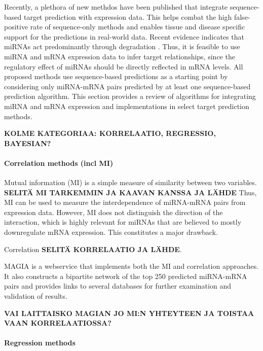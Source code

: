 Recently, a plethora of new methdos have been published that integrate
sequence-based target prediction with expression data. This helps combat the
high false-positive rate of sequence-only methods and enables tissue and
disease specific support for the predictions in real-world data. Recent
evidence indicates that miRNAs act predominantly through degradation
\citep{CITE}. Thus, it is feasible to use miRNA and mRNA expression data to
infer target relationships, since the regulatory effect of miRNAs should be
directly reflected in mRNA levels. All proposed methods use sequence-based
predictions as a starting point by considering only miRNA-mRNA pairs predicted
by at least one sequence-based prediction algorithm. This section provides a
review of algorithms for integrating miRNA and mRNA expression and
implementations in select target prediction methods.

\textbf{KOLME KATEGORIAA: KORRELAATIO, REGRESSIO, BAYESIAN?}



\paragraph{Correlation methods (incl MI)}\label{correlation-methods}

Mutual information (MI) is a simple measure of similarity between two
variables. \textbf{SELITÄ MI TARKEMMIN JA KAAVAN KANSSA JA LÄHDE} Thus, MI can
be used to measure the interdependence of miRNA-mRNA pairs from expression
data. However, MI does not distinguish the direction of the interaction, which
is highly relevant for miRNAs that are believed to mostly downregulate mRNA
expression. This constitutes a major drawback.

Correlation \textbf{SELITÄ KORRELAATIO JA LÄHDE}.

MAGIA \citep{Sales2010} is a webservice that implements both the MI and
correlation approaches. It also constructs a bipartite network of the top 250
predicted miRNA-mRNA pairs and provides links to several databases for further
examination and validation of results.

\textbf{VAI LAITTAISKO MAGIAN JO MI:N YHTEYTEEN JA TOISTAA VAAN
KORRELAATIOSSA?}



\paragraph{Regression methods}\label{regression-methods}

